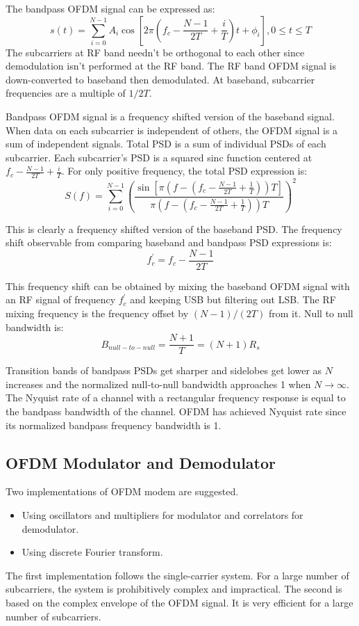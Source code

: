 The bandpass \gls{OFDM} signal can be expressed as\cite{fuqin}:
$$s(t) = \sum_{i=0}^{N-1}A_i\cos\left[ 2\pi\left( f_c-\frac{N-1}{2T}+\frac{i}{T}\right)t + \phi_i\right], 0\leq t\leq T$$
The \gls{subcarrier}s at \gls{RF} band needn't be \gls{orthogonal} to each other since demodulation isn't performed at the \gls{RF} band\cite{fuqin}. The RF band OFDM signal is down-converted to baseband then demodulated. At baseband, subcarrier frequencies are a multiple of $1/2T$\cite{fuqin}.

Bandpass OFDM signal is a frequency shifted version of the baseband signal. When data on each subcarrier is independent of others, the OFDM signal is a sum of independent signals. Total PSD is a sum of individual PSDs of each subcarrier. Each subcarrier's PSD is a squared sinc function centered at $f_c - \frac{N-1}{2T}+\frac{i}{T}$. For only positive frequency, the total PSD expression is:
$$S(f) = \sum_{i=0}^{N-1}\left( \frac{\sin\left[ \pi(f-(f_c-\frac{N-1}{2T}+\frac{1}{T}))T\right]}{\pi(f-(f_c-\frac{N-1}{2T}+\frac{1}{T}))T}\right)^2$$

This is clearly a frequency shifted version of the baseband \gls{PSD}. The frequency shift observable from comparing baseband and bandpass \gls{PSD} expressions is:
$$f_c^\prime = f_c - \frac{N-1}{2T}$$

This frequency shift can be obtained by mixing the baseband OFDM signal with an RF signal of frequency $f_c^\prime$ and keeping \gls{USB} but filtering out \gls{LSB}. The RF mixing frequency is the frequency offset by $(N-1)/(2T)$ from it.
Null to null bandwidth is:
$$B_{null-to-null}=\frac{N+1}{T}=(N+1)R_s$$

Transition bands of bandpass PSDs get sharper and sidelobes get lower as $N$ increases and the normalized null-to-null bandwidth approaches 1 when $N\to\infty$\cite{fuqin}.
The Nyquist rate of a channel with a rectangular frequency response is equal to the bandpass bandwidth of the channel. OFDM has achieved Nyquist rate since its normalized bandpass frequency bandwidth is 1\cite{fuqin}. 

\subsection{OFDM Modulator and Demodulator}
Two implementations of OFDM modem are suggested.
\begin{itemize}
	\item Using oscillators and multipliers for modulator and correlators for demodulator.
	\item Using discrete Fourier transform.
\end{itemize}
The first implementation follows the single-carrier system. For a large number of subcarriers, the system is prohibitively complex and impractical. The second is based on the complex envelope of the OFDM signal. It is very efficient for a large number of subcarriers.

